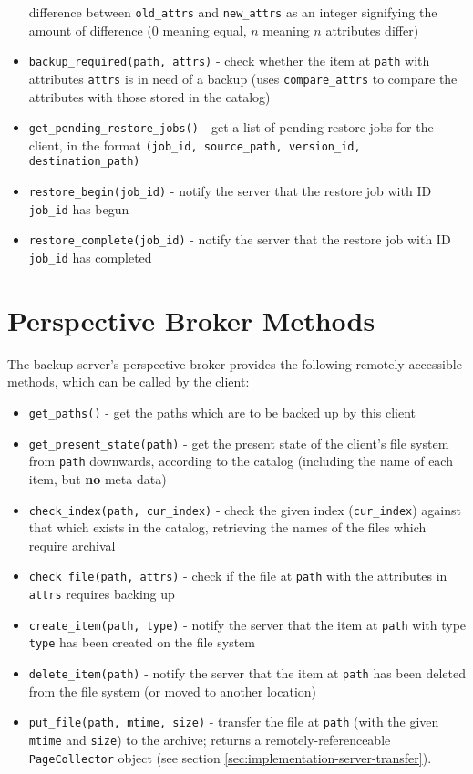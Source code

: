 \begin{itemize}
        difference between \verb!old_attrs! and \verb!new_attrs! as an integer
        signifying the amount of difference ($0$ meaning equal, $n$ meaning $n$
        attributes differ)
    \item \verb!backup_required(path, attrs)! - check whether the item at
        \verb!path! with attributes \verb!attrs! is in need of a backup (uses
        \verb!compare_attrs! to compare the attributes with those stored in the
        catalog)
    \item \verb!get_pending_restore_jobs()! - get a list of pending restore
        jobs for the client, in the format
        \verb!(job_id, source_path, version_id, destination_path)!
    \item \verb!restore_begin(job_id)! - notify the server that the restore job
        with ID \verb!job_id! has begun
    \item \verb!restore_complete(job_id)! - notify the server that the restore
        job with ID \verb!job_id! has completed
\end{itemize}

\section{Perspective Broker Methods}
\label{sec:appendix-server-pb-methods}

The backup server's perspective broker provides the following
remotely-accessible methods, which can be called by the client:

\begin{itemize}
    \item \verb!get_paths()! - get the paths which are to be backed up by this
        client
    \item \verb!get_present_state(path)! - get the present state of the
        client's file system from \verb!path! downwards, according to the
        catalog (including the name of each item, but \textbf{no} meta data)
    \item \verb!check_index(path, cur_index)! - check the given index
        (\verb!cur_index!) against that which exists in the catalog, retrieving
        the names of the files which require archival
    \item \verb!check_file(path, attrs)! - check if the file at \verb!path!
        with the attributes in \verb!attrs! requires backing up
    \item \verb!create_item(path, type)! - notify the server that the item at
        \verb!path! with type \verb!type! has been created on the file system
    \item \verb!delete_item(path)! - notify the server that the item at
        \verb!path! has been deleted from the file system (or moved to another
        location)
    \item \verb!put_file(path, mtime, size)! - transfer the file at \verb!path!
        (with the given \verb!mtime! and \verb!size!) to the archive; returns
        a remotely-referenceable \verb!PageCollector! object (see section
        \ref{sec:implementation-server-transfer}).
\end{itemize}
